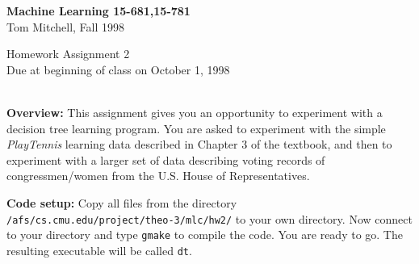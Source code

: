 

\oddsidemargin 0cm      %
\evensidemargin 0cm
\textwidth 16.5cm



\newcommand{\bi}{\begin{itemize}}
\newcommand{\ei}{\end{itemize}}
\newcommand{\be}{\begin{enumerate}}
\newcommand{\ee}{\end{enumerate}}
\newcommand{\tand}{\wedge}
\newcommand{\tor}{\vee}
\newcommand{\union}{\cup}
\newcommand{\intersection}{\cap}
\newcommand{\ch}{$\surd$}
\newcommand{\pgm}[1]{{\sc #1}}
\newcommand{\la}{\leftarrow}
\newcommand{\ra}{\rightarrow}


\begin{center}
\large
{\bf Machine Learning 15-681,15-781}\\
Tom Mitchell, Fall 1998
\end{center}

\begin{center}
\large  Homework Assignment 2\\
Due at beginning of class on October 1, 1998 \\
\ \\

\end{center}

\noindent
{\bf Overview:} This assignment gives you an opportunity to experiment with a
decision tree learning program.  You are asked to experiment with the simple
{\em PlayTennis} learning data described in Chapter 3 of the textbook, and
then to experiment with a larger set of data describing voting records of
congressmen/women from the U.S. House of Representatives.

\vspace{.06in}

\noindent
{\bf Code setup:} Copy all files from the directory {\tt
/afs/cs.cmu.edu/project/theo-3/mlc/hw2/} to your own directory.  Now connect
to your directory and type {\tt gmake} to compile the code.  You are ready to
go.  The resulting executable will be called {\tt dt}.




\vspace*{.06in}

